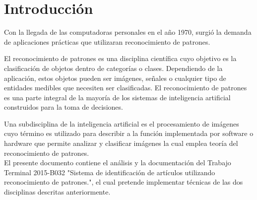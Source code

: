 \section{Introducci\'on}

Con la llegada de las computadoras personales en el a\~no 1970, surgi\'o la demanda de aplicaciones pr\'acticas que utilizaran reconocimiento de patrones.

El reconocimiento de patrones es una disciplina cient\'ifica cuyo objetivo es la clasificaci\'on de objetos dentro de categor\'ias o clases. Dependiendo de la aplicaci\'on, estos objetos pueden ser im\'agenes, se\~ nales o cualquier tipo de entidades medibles que necesiten ser clasificadas.\cite{reconoci} El reconocimiento de patrones es una parte integral de la mayor\'ia de los sistemas de inteligencia artificial construidos para la toma de decisiones.
        
Una subdisciplina de  la inteligencia artificial es el procesamiento de im\'agenes  cuyo t\'ermino es utilizado para describir a la funci\'on implementada por software o hardware que permite analizar y clasificar im\'agenes la cual emplea teor\'ia del reconocimiento de patrones. \cite{intelig} \\

El presente documento contiene el an\'alisis y la documentaci\'on del Trabajo Terminal 2015-B032 "Sistema de identificaci\'on de art\'iculos utilizando reconocimiento de patrones.", el cual pretende implementar t\'ecnicas de las dos disciplinas descritas anteriormente.
\pagebreak